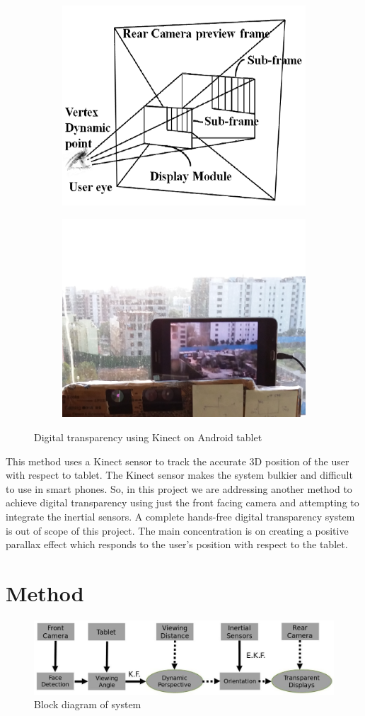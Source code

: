 \documentclass[12pt,twocolumn,letterpaper]{article}
\begin{document}
\begin{figure}[!htbp]
\centering
\begin{subfigure}{0.22\textwidth}
\includegraphics[height=30 mm]{images/transparenttablet}
\end{subfigure}
\begin{subfigure}{0.22\textwidth}
\includegraphics[height=30 mm]{images/transparenttablet1}
\end{subfigure}
\caption{Digital transparency using Kinect on Android tablet}
\label{fig:digitaltransparency}
\end{figure}

This method uses a Kinect sensor to track the accurate 3D position of the user with respect to tablet. The Kinect sensor makes the system bulkier and difficult to use in smart phones. So, in this project we are addressing another method to achieve digital transparency using just the front facing camera and attempting to integrate the inertial sensors. A complete hands-free digital transparency system is out of scope of this project. The main concentration is on creating a positive parallax effect which responds to the user's position with respect to the tablet.

\section{Method}
\begin{figure}[!htbp]
\includegraphics[scale=0.21]{images/block}
\caption{Block diagram of system}
\label{fig:blockdia}
\end{figure}
\end{document}
